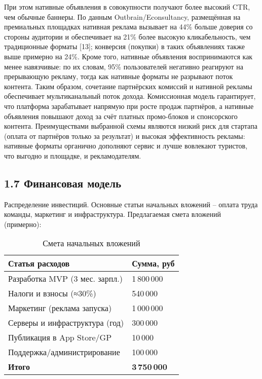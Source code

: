 При этом нативные объявления в совокупности получают более высокий CTR, чем обычные баннеры. По данным Outbrain/Econsultancy, размещённая на премиальных площадках нативная реклама вызывает на 44\% больше доверия со стороны аудитории и обеспечивает на 21\% более высокую кликабельность, чем традиционные форматы [13]; конверсия (покупки) в таких объявлениях также выше примерно на 24\%. Кроме того, нативные объявления воспринимаются как менее навязчивые: по их словам, 95\% пользователей негативно реагируют на прерывающую рекламу, тогда как нативные форматы не разрывают поток контента. Таким образом, сочетание партнёрских комиссий и нативной рекламы обеспечивает мультиканальный поток дохода. Комиссионная модель гарантирует, что платформа зарабатывает напрямую при росте продаж партнёров, а нативные объявления повышают доход за счёт платных промо-блоков и спонсорского контента. Преимуществами выбранной схемы являются низкий риск для стартапа (оплата от партнёров только за результат) и высокая эффективность рекламы: нативные форматы органично дополняют сервис и лучше вовлекают туристов, что выгодно и площадке, и рекламодателям.

\subsection*{1.7 Финансовая модель}
Распределение инвестиций. Основные статьи начальных вложений – оплата труда команды, маркетинг и инфраструктура. Предлагаемая смета вложений (примерно):

\begin{table}[h]
\centering
\begin{tabular}{| p{95mm} | p{35mm} |}
\hline
\textbf{Статья расходов} & \textbf{Сумма, руб} \\
\hline
Разработка MVP (3 мес. зарпл.) & 1\,800\,000 \\
\hline
Налоги и взносы (≈30\%) & 540\,000 \\
\hline
Маркетинг (реклама запуска) & 1\,000\,000 \\
\hline
Серверы и инфраструктура (год) & 300\,000 \\
\hline
Публикация в App Store/GP & 10\,000 \\
\hline
Поддержка/администрирование & 100\,000 \\
\hline
\textbf{Итого} & \textbf{3\,750\,000} \\
\hline
\end{tabular}
\caption{Смета начальных вложений}
\end{table}

